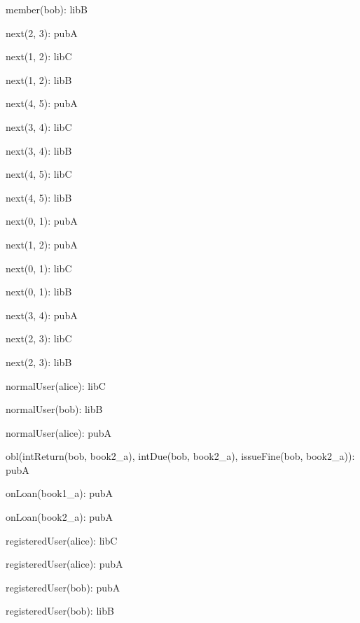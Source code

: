 \documentclass{article}
\newenvironment{states}
        {\begin{minipage}{\tableWidth}\raggedright\begin{description}[align=left,leftmargin=1em,noitemsep,labelsep=\parindent]}
        {\end{description}\end{minipage}}
\begin{document}
{\begin{states}
\item{{member(\allowbreak{}bob): libB}}
\item{{next(\allowbreak{}2, 3): pubA}}
\item{{next(\allowbreak{}1, 2): libC}}
\item{{next(\allowbreak{}1, 2): libB}}
\item{{next(\allowbreak{}4, 5): pubA}}
\item{{next(\allowbreak{}3, 4): libC}}
\item{{next(\allowbreak{}3, 4): libB}}
\item{{next(\allowbreak{}4, 5): libC}}
\item{{next(\allowbreak{}4, 5): libB}}
\item{{next(\allowbreak{}0, 1): pubA}}
\item{{next(\allowbreak{}1, 2): pubA}}
\item{{next(\allowbreak{}0, 1): libC}}
\item{{next(\allowbreak{}0, 1): libB}}
\item{{next(\allowbreak{}3, 4): pubA}}
\item{{next(\allowbreak{}2, 3): libC}}
\item{{next(\allowbreak{}2, 3): libB}}
\item{{normalUser(\allowbreak{}alice): libC}}
\item{{normalUser(\allowbreak{}bob): libB}}
\item{{normalUser(\allowbreak{}alice): pubA}}
\item{{obl(\allowbreak{}intReturn(\allowbreak{}bob, book2\_a), intDue(\allowbreak{}bob, book2\_a), issueFine(\allowbreak{}bob, book2\_a)): pubA}}
\item{{onLoan(\allowbreak{}book1\_a): pubA}}
\item{{onLoan(\allowbreak{}book2\_a): pubA}}
\item{{registeredUser(\allowbreak{}alice): libC}}
\item{{registeredUser(\allowbreak{}alice): pubA}}
\item{{registeredUser(\allowbreak{}bob): pubA}}
\item{{registeredUser(\allowbreak{}bob): libB}}
\end{states}}
\end{document}
